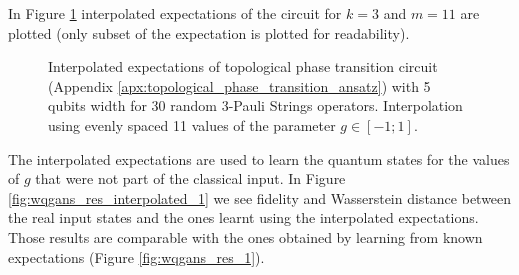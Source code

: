 In Figure \ref{fig:phase_exps} interpolated expectations of the circuit for
$k=3$ and $m=11$ are plotted (only subset of the expectation is plotted for readability).

\begin{figure}[htbp!]
  \captionsetup[subfigure]{labelformat=empty}
  \centering
  \caption{Interpolated expectations of topological phase transition circuit (Appendix
    \ref{apx:topological_phase_transition_ansatz}) with 5 qubits width for 30
    random 3-Pauli Strings operators. Interpolation using evenly
    spaced 11 values of the parameter $g \in [-1; 1]$. 
  }
  \label{fig:phase_exps}
\end{figure}

The interpolated expectations are used to learn the quantum states for
the values of $g$ that were not part of the classical input. In Figure
\ref{fig:wqgans_res_interpolated_1} we see fidelity and Wasserstein distance
between the real input states and the ones learnt using the interpolated
expectations.
Those results are comparable with the ones obtained by learning from known
expectations (Figure \ref{fig:wqgans_res_1}).

